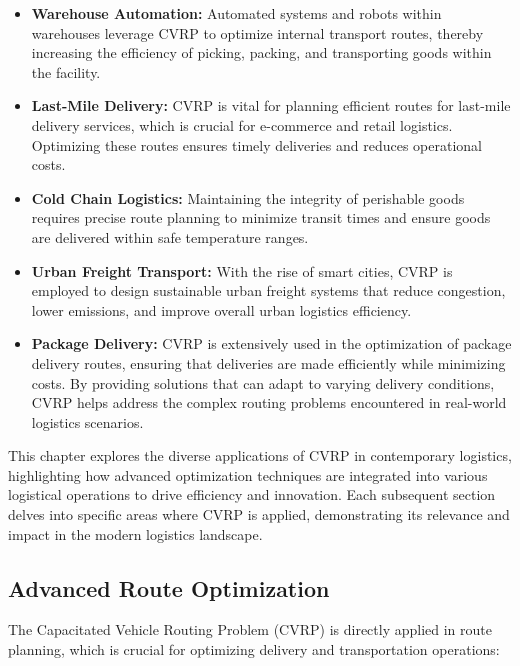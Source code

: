 \documentclass{article}
\begin{document}
    \begin{itemize}
        \item \textbf{Warehouse Automation:} Automated systems and robots within warehouses leverage CVRP to optimize internal transport routes, thereby increasing the efficiency of picking, packing, and transporting goods within the facility. \cite{toth2014vehicle}
        \item \textbf{Last-Mile Delivery:} CVRP is vital for planning efficient routes for last-mile delivery services, which is crucial for e-commerce and retail logistics. Optimizing these routes ensures timely deliveries and reduces operational costs. \cite{toth2014vehicle}
        \item \textbf{Cold Chain Logistics:} Maintaining the integrity of perishable goods requires precise route planning to minimize transit times and ensure goods are delivered within safe temperature ranges. \cite{wang2017optimization}
        \item \textbf{Urban Freight Transport:} With the rise of smart cities, CVRP is employed to design sustainable urban freight systems that reduce congestion, lower emissions, and improve overall urban logistics efficiency. \cite{toth2014vehicle}
        \item \textbf{Package Delivery:} CVRP is extensively used in the optimization of package delivery routes, ensuring that deliveries are made efficiently while minimizing costs. By providing solutions that can adapt to varying delivery conditions, CVRP helps address the complex routing problems encountered in real-world logistics scenarios. \cite{toth2014vehicle}
    \end{itemize}

    This chapter explores the diverse applications of CVRP in contemporary logistics, highlighting how advanced optimization techniques are integrated into various logistical operations to drive efficiency and innovation. Each subsequent section delves into specific areas where CVRP is applied, demonstrating its relevance and impact in the modern logistics landscape.

    \subsection{Advanced Route Optimization}

    The Capacitated Vehicle Routing Problem (CVRP) is directly applied in route planning, which is crucial for optimizing delivery and transportation operations:
\end{document}
